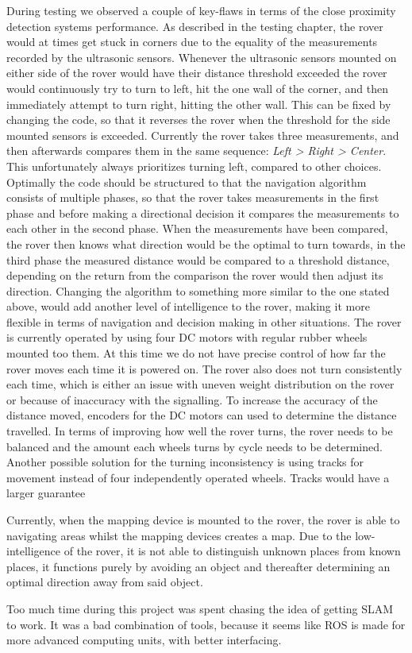 During testing we observed a couple of key-flaws in terms of the close proximity detection systems performance.
As described in the testing chapter, the rover would at times get stuck in corners due to the equality of the measurements recorded by the ultrasonic sensors. Whenever the ultrasonic sensors mounted on either side of the rover would have their distance threshold exceeded the rover would continuously try to turn to left, hit the one wall of the corner, and then immediately attempt to turn right, hitting the other wall. This can be fixed by changing the code, so that it reverses the rover when the threshold for the side mounted sensors is exceeded. Currently the rover takes three measurements, and then afterwards compares them in the same sequence: \textit{Left > Right > Center}. This unfortunately always prioritizes turning left, compared to other choices. Optimally the code should be structured to that the navigation algorithm consists of multiple phases, so that the rover takes measurements in the first phase and before making a directional decision it compares the measurements to each other in the second phase. When the measurements have been compared, the rover then knows what direction would be the optimal to turn towards, in the third phase the measured distance would be compared to a threshold distance, depending on the return from the comparison the rover would then adjust its direction.
Changing the algorithm to something more similar to the one stated above, would add another level of intelligence to the rover, making it more flexible in terms of navigation and decision making in other situations.
The rover is currently operated by using four DC motors with regular rubber wheels mounted too them. At this time we do not have precise control of how far the rover moves each time it is powered on. The rover also does not turn consistently each time, which is either an issue with uneven weight distribution on the rover or because of inaccuracy with the signalling.
To increase the accuracy of the distance moved, encoders for the DC motors can used to determine the distance travelled. In terms of improving how well the rover turns, the rover needs to be balanced and the amount each wheels turns by cycle needs to be determined. Another possible solution for the turning inconsistency is using tracks for movement instead of four independently operated wheels. Tracks would have a larger guarantee



Currently, when the mapping device is mounted to the rover, the rover is able to navigating areas whilst the mapping devices creates a map. Due to the low-intelligence of the rover, it is not able to distinguish unknown places from known places, it functions purely by avoiding an object and thereafter determining an optimal direction away from said object.


Too much time during this project was spent chasing the idea of getting SLAM to work. It was a bad combination of tools, because it seems like ROS is made for more advanced computing units, with better interfacing. 
